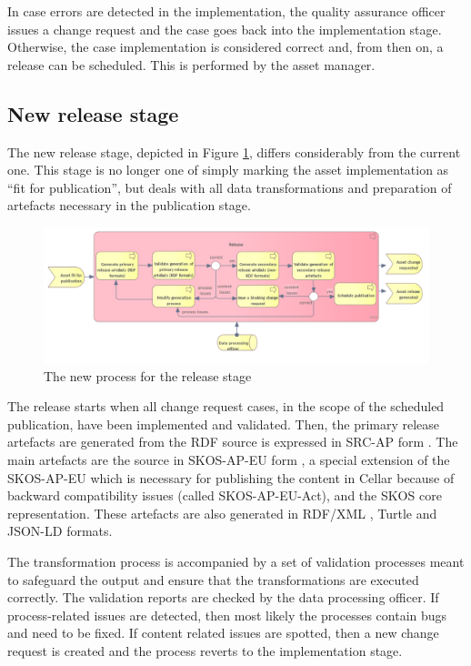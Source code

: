 	In case errors are detected in the implementation, the quality assurance officer issues a  change request and the case goes back into the implementation stage. Otherwise, the case implementation is considered correct and, from then on, a release can be scheduled. This is performed by the asset manager. 
		
	\subsection{New release stage}
	\label{sec:release-new}
	
	The new release stage, depicted in Figure \ref{fig:release-new}, differs considerably from the current one. This stage is no longer one of simply marking the asset implementation as ``fit for publication'', but deals with all data transformations and preparation of artefacts necessary in the publication stage.
	
	\begin{figure}[h]
		\centering
		\includegraphics[width=1.05\textwidth]{images/business/new/Release.png}
		\caption{The new process for the release stage}
		\label{fig:release-new}
	\end{figure}

	The release starts when all change request cases, in the scope of the scheduled publication, have been implemented and validated. Then, the primary release artefacts are generated from the RDF source is expressed in SRC-AP form \citep{src-ap-vb3}. The main artefacts are the source in SKOS-AP-EU form \citep{skos-ap-eu}, a special extension of the SKOS-AP-EU which is necessary for publishing the content in Cellar because of backward compatibility issues (called SKOS-AP-EU-Act), and the SKOS core \citep{skos-spec} representation. These artefacts are also generated in RDF/XML \citep{rdf-xml-Schreiber:14:RXS,rdf-xml-Beckett:04:RSS}, Turtle \citep{turtle-Carothers:14:RT} and JSON-LD \citep{sporny2014json,spornyjson} formats. 
	
	The transformation process is accompanied by a set of validation processes meant to safeguard the output and ensure that the transformations are executed correctly. The validation reports are checked by the data processing officer. If process-related issues are detected, then most likely the processes contain bugs and need to be fixed. If content related issues are spotted, then a new change request is created and the process reverts to the implementation stage. 
	
